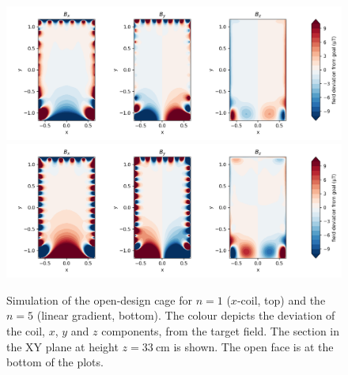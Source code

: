 


\begin{figure}
  \centering
  \includegraphics[width=\linewidth]{gfx/prototype/open_design_Xcoil_field_XY_z0_33.png}
  \includegraphics[width=\linewidth]{gfx/prototype/open_design_n5coil_field_XY_z0_33.png}
  \caption{Simulation of the open-design cage for $n = 1$ ($x$-coil, top) and the $n = 5$ (linear gradient, bottom).
  The colour depicts the deviation of the coil, $x$, $y$ and $z$ components, from the target field.
  The section in the XY plane at height $z=\SI{33}{\centi\meter}$ is shown.
  The open face is at the bottom of the plots.
  }\label{fig:prototype_open_design_simulation}
\end{figure}

